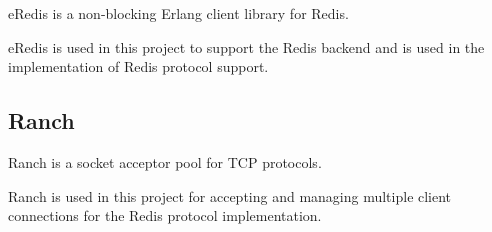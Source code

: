 eRedis \citep{eredis} is a non-blocking Erlang client library for Redis.

eRedis is used in this project to support the Redis backend and is used in the
implementation of Redis protocol support.

\subsection{Ranch}

Ranch \citep{ranch} is a socket acceptor pool for TCP protocols.

Ranch is used in this project for accepting and managing multiple client
connections for the Redis protocol implementation.

